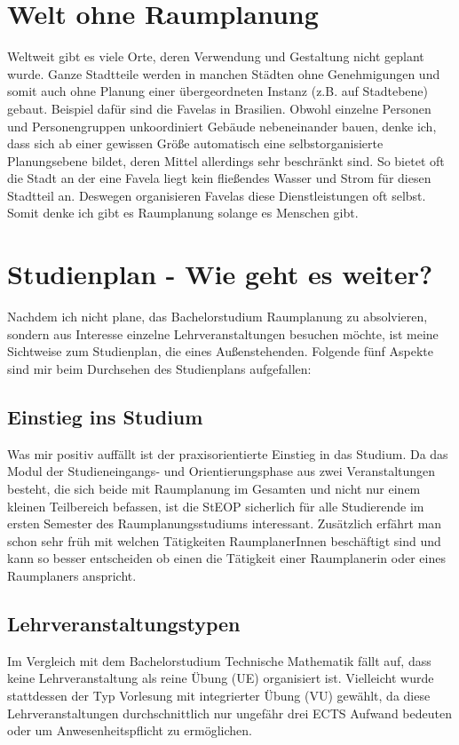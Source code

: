 \documentclass[]{article}
\begin{document}
\section{Welt ohne Raumplanung}
Weltweit gibt es viele Orte, deren Verwendung und Gestaltung nicht geplant wurde. Ganze Stadtteile werden in manchen Städten ohne Genehmigungen und somit auch ohne Planung einer übergeordneten Instanz (z.B. auf Stadtebene) gebaut. Beispiel dafür sind die Favelas in Brasilien. Obwohl einzelne Personen und Personengruppen unkoordiniert Gebäude nebeneinander bauen, denke ich, dass sich ab einer gewissen Größe automatisch eine selbstorganisierte Planungsebene bildet, deren Mittel allerdings sehr beschränkt sind. So bietet oft die Stadt an der eine Favela liegt kein fließendes Wasser und Strom für diesen Stadtteil an. Deswegen organisieren Favelas diese Dienstleistungen oft selbst. Somit denke ich gibt es Raumplanung solange es Menschen gibt.

\section{Studienplan - Wie geht es weiter?}
Nachdem ich nicht plane, das Bachelorstudium Raumplanung zu absolvieren, sondern aus Interesse einzelne Lehrveranstaltungen besuchen möchte, ist meine Sichtweise zum Studienplan, die eines Außenstehenden. Folgende fünf Aspekte sind mir beim Durchsehen des Studienplans aufgefallen:

\subsection{Einstieg ins Studium}
Was mir positiv auffällt ist der praxisorientierte Einstieg in das Studium. Da das Modul der Studieneingangs- und Orientierungsphase aus zwei Veranstaltungen besteht, die sich beide mit Raumplanung im Gesamten und nicht nur einem kleinen Teilbereich befassen, ist die StEOP sicherlich für alle Studierende im ersten Semester des Raumplanungsstudiums interessant. Zusätzlich erfährt man schon sehr früh mit welchen Tätigkeiten RaumplanerInnen beschäftigt sind und kann so besser entscheiden ob einen die Tätigkeit einer Raumplanerin oder eines Raumplaners anspricht.

\subsection{Lehrveranstaltungstypen}
Im Vergleich mit dem Bachelorstudium Technische Mathematik fällt auf, dass keine Lehrveranstaltung als reine Übung (UE) organisiert ist. Vielleicht wurde stattdessen der Typ Vorlesung mit integrierter Übung (VU) gewählt, da diese Lehrveranstaltungen durchschnittlich nur ungefähr drei ECTS Aufwand bedeuten oder um Anwesenheitspflicht zu ermöglichen.
\end{document}
